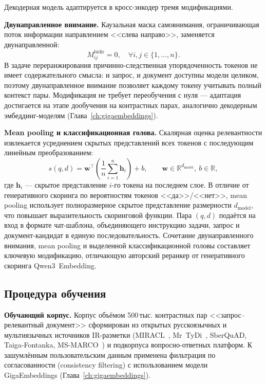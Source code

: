 Декодерная модель адаптируется в кросс-энкодер тремя модификациями.

\textbf{Двунаправленное внимание.} Каузальная маска самовнимания, ограничивающая поток информации направлением <<слева направо>>, заменяется двунаправленной:
\begin{equation}
\label{eq:rr_bidir}
    M^{\text{bidir}}_{ij} = 0, \quad \forall i, j \in \{1, \ldots, n\}.
\end{equation}
В задаче переранжирования причинно-следственная упорядоченность токенов не имеет содержательного смысла: и запрос, и документ доступны модели целиком, поэтому двунаправленное внимание позволяет каждому токену учитывать полный контекст пары.
Модификация не требует переобучения с нуля --- адаптация достигается на этапе дообучения на контрастных парах, аналогично декодерным эмбеддинг-моделям (Глава~\ref{ch:gigaembeddings}).

\textbf{Mean pooling и классификационная голова.} Скалярная оценка релевантности извлекается усреднением скрытых представлений всех токенов с последующим линейным преобразованием:
\begin{equation}
\label{eq:rr_score}
    s(q, d) = \mathbf{w}^\top \!\left(\frac{1}{n} \sum_{i=1}^{n} \mathbf{h}_i\right) + b, \qquad \mathbf{w} \in \mathbb{R}^{d_{\text{model}}},\ b \in \mathbb{R},
\end{equation}
где $\mathbf{h}_i$ --- скрытое представление $i$-го токена на последнем слое.
В отличие от генеративного скоринга по вероятностям токенов <<да>>/<<нет>>, mean pooling использует полноразмерное скрытое представление размерности $d_{\text{model}}$, что повышает выразительность скоринговой функции.
Пара $(q, d)$ подаётся на вход в формате чат-шаблона, объединяющего инструкцию задачи, запрос и документ-кандидат в единую последовательность.
Сочетание двунаправленного внимания, mean pooling и выделенной классификационной головы составляет ключевую модификацию, отличающую авторский реранкер от генеративного скоринга Qwen3~Embedding.

\subsection{Процедура обучения}\label{subsec:rr_training}

\textbf{Обучающий корпус.} Корпус объёмом 500\,тыс. контрастных пар <<запрос--релевантный документ>> сформирован из открытых русскоязычных и мультиязычных источников IR-разметки (MIRACL~\cite{zhang2023miracl}, Mr~TyDi~\cite{zhang2021mrtydi}, SberQuAD, Taiga-Fontanka, MS-MARCO~\cite{bajaj2018msmarco}) и подкорпуса вопросно-ответных платформ.
К зашумлённым пользовательским данным применена фильтрация по согласованности (consistency filtering) с использованием модели GigaEmbeddings (Глава~\ref{ch:gigaembeddings}).

